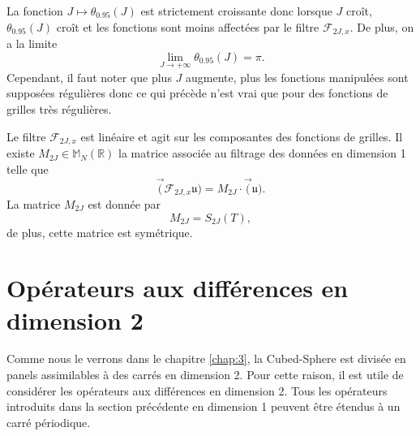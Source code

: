 La fonction $J \mapsto \theta_{0.95}(J)$ est strictement croissante donc lorsque $J$ croît, $\theta_{0.95}(J)$ croît et les fonctions sont moins affectées par le filtre $\mathcal{F}_{2J,x}$. De plus, on a la limite
\begin{equation}
\lim_{J \rightarrow +\infty} \theta_{0.95}(J) = \pi.
\end{equation}
Cependant, il faut noter que plus $J$ augmente, plus les fonctions manipulées sont supposées régulières donc ce qui précède n'est vrai que pour des fonctions de grilles très régulières.

\begin{remarque}
Le filtre $\mathcal{F}_{2J,x}$ est linéaire et agit sur les composantes des fonctions de grilles. Il existe $M_{2J} \in \mathbb{M}_N \left( \mathbb{R} \right)$ la matrice associée au filtrage des données en dimension 1 telle que
\begin{equation}
\vec( \mathcal{F}_{2J,x} \mathfrak{u}) = M_{2J} \cdot  \vec(\mathfrak{u}).
\end{equation}
La matrice $M_{2J}$ est donnée par
\begin{equation}
M_{2J} = S_{2J}(T),
\label{eq:matrice_filtrage}
\end{equation}
de plus, cette matrice est symétrique.
\end{remarque}































\section{Opérateurs aux différences en dimension 2}

Comme nous le verrons dans le chapitre \ref{chap:3}, la Cubed-Sphere est divisée en panels assimilables à des carrés en dimension 2. Pour cette raison, il est utile de considérer les opérateurs aux différences en dimension 2. Tous les opérateurs introduits dans la section précédente en dimension 1 peuvent être étendus à un carré périodique.


